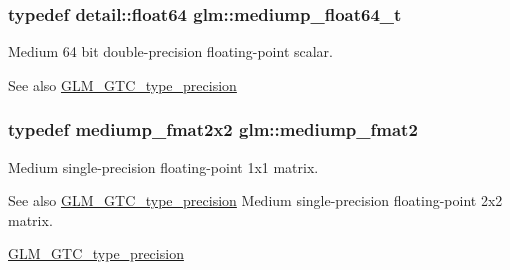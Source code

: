\subsubsection[{\texorpdfstring{mediump\+\_\+float64\+\_\+t}{mediump_float64_t}}]{\setlength{\rightskip}{0pt plus 5cm}typedef detail\+::float64 {\bf glm\+::mediump\+\_\+float64\+\_\+t}}\hypertarget{group__gtc__type__precision_ga97a0747b103eb5ef320a91888de52f51}{}\label{group__gtc__type__precision_ga97a0747b103eb5ef320a91888de52f51}
Medium 64 bit double-\/precision floating-\/point scalar. \begin{DoxySeeAlso}{See also}
\hyperlink{group__gtc__type__precision}{G\+L\+M\+\_\+\+G\+T\+C\+\_\+type\+\_\+precision} 
\end{DoxySeeAlso}
\subsubsection[{\texorpdfstring{mediump\+\_\+fmat2}{mediump_fmat2}}]{\setlength{\rightskip}{0pt plus 5cm}typedef mediump\+\_\+fmat2x2 {\bf glm\+::mediump\+\_\+fmat2}}\hypertarget{group__gtc__type__precision_ga5b9de77ef7403ffc972700219eca5450}{}\label{group__gtc__type__precision_ga5b9de77ef7403ffc972700219eca5450}
Medium single-\/precision floating-\/point 1x1 matrix. \begin{DoxySeeAlso}{See also}
\hyperlink{group__gtc__type__precision}{G\+L\+M\+\_\+\+G\+T\+C\+\_\+type\+\_\+precision} Medium single-\/precision floating-\/point 2x2 matrix. 

\hyperlink{group__gtc__type__precision}{G\+L\+M\+\_\+\+G\+T\+C\+\_\+type\+\_\+precision} 
\end{DoxySeeAlso}
